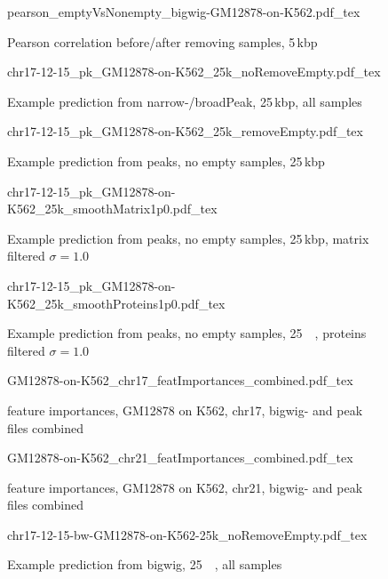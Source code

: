 \begin{figure}[hp]
 \centering
 \scriptsize
 {pearson_emptyVsNonempty_bigwig-GM12878-on-K562.pdf_tex}
 \caption{Pearson correlation before/after removing samples, 5\,kbp}
 \label{fig:results:bigwig:Pearson}
\end{figure}
\begin{figure}[hp]
 \centering
 \scriptsize
 {chr17-12-15_pk_GM12878-on-K562_25k_noRemoveEmpty.pdf_tex}
 \caption{Example prediction from narrow-/broadPeak, 25\,kbp, all samples}
 \label{fig:results:pk:allsamples:25k}
\end{figure}
\begin{figure}[hp]
 \centering
 \scriptsize
 {chr17-12-15_pk_GM12878-on-K562_25k_removeEmpty.pdf_tex}
 \caption{Example prediction from peaks, no empty samples, 25\,kbp}
 \label{fig:results:pk:noemptysamples:25k}
\end{figure}
\begin{figure}[hp]
 \centering
 \scriptsize
 {chr17-12-15_pk_GM12878-on-K562_25k_smoothMatrix1p0.pdf_tex}
 \caption{Example prediction from peaks, no empty samples, 25\,kbp, matrix filtered $\sigma=1.0$}
 \label{fig:results:pk:smoothened:25k}
\end{figure}
\begin{figure}[hp]
 \centering
 \scriptsize
 {chr17-12-15_pk_GM12878-on-K562_25k_smoothProteins1p0.pdf_tex}
 \caption{Example prediction from peaks, no empty samples, \SI{25}{\kilo\bp}, proteins filtered $\sigma=1.0$}
 \label{fig:results:pk:proteinsSmoothened:25k}
\end{figure}
\begin{figure}[hp]
 \tiny
 \centering
 {GM12878-on-K562_chr17_featImportances_combined.pdf_tex}
 \caption{feature importances, GM12878 on K562, chr17, bigwig- and peak files combined}
 \label{fig:chr17:GM12878:K562:combined:featImport}
\end{figure}
\begin{figure}[hp]
 \tiny
 \centering
 {GM12878-on-K562_chr21_featImportances_combined.pdf_tex}
 \caption{feature importances, GM12878 on K562, chr21, bigwig- and peak files combined}
 \label{fig:chr21:GM12878:K562:combined:featImport}
\end{figure}
\begin{figure}[hp]
 \centering
 \scriptsize
 {chr17-12-15-bw-GM12878-on-K562-25k_noRemoveEmpty.pdf_tex}
 \caption{Example prediction from bigwig, \SI{25}{\kilo\bp}, all samples}
 \label{fig:results:bigwig:allsamples:25k}
\end{figure}

